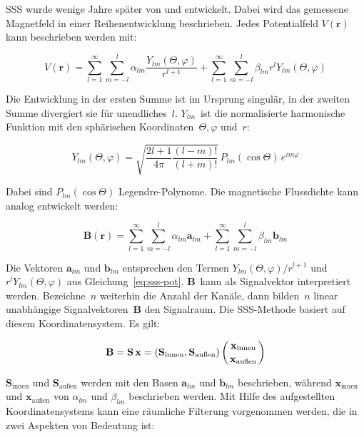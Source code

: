 \documentclass[doc,a4paper,12pt]{apa6}
\newcommand{\mx}[1]{\mathbf{#1}}
\begin{document}
SSS wurde wenige Jahre später von \textcite{taulu2004suppression} und \textcite{taulu2005presentation} entwickelt. Dabei wird das gemessene Magnetfeld in einer Reihenentwicklung beschrieben. Jedes Potentialfeld $V(\mx{r})$ kann beschrieben werden mit:

\begin{equation}
V(\mx{r}) = \sum_{l=1}^\infty \sum_{m=-l}^l \alpha_{lm} \frac{Y_{lm}(\Theta, \varphi)}{r^{l+1}} + \sum_{l=1}^\infty \sum_{m=-l}^l \beta_{lm} r^l Y_{lm}(\Theta, \varphi) 
\label{eq:sss-pot}
\end{equation}

Die Entwicklung in der ersten Summe ist im Ursprung singulär, in der zweiten Summe divergiert sie für unendliches~$l$. $Y_{lm}$~ist die normalisierte harmonische Funktion mit den sphärischen Koordinaten~$\Theta, \varphi$ und~$r$:

\begin{equation}
Y_{lm}(\Theta, \varphi) = \sqrt{\frac{2l+1}{4\pi} \frac{(l-m)!}{(l+m)!}}\, P_{lm}(\cos{\Theta})\,e^{im\varphi}
\end{equation}

Dabei sind $P_{lm}(\cos{\Theta})$ Legendre-Polynome. Die magnetische Flussdichte kann analog entwickelt werden:

\begin{equation}
\mx{B}(\mx{r}) = \sum_{l=1}^\infty \sum_{m=-l}^l \alpha_{lm} \mx{a}_{lm} + \sum_{l=1}^\infty \sum_{m=-l}^l \beta_{lm} \mx{b}_{lm}
\label{eq:sss-magpot}
\end{equation}

Die Vektoren $\mx{a}_{lm}$ und $\mx{b}_{lm}$ entsprechen den Termen $Y_{lm}(\Theta, \varphi)/r^{l+1}$ und $r^l Y_{lm}(\Theta, \varphi)$ aus Gleichung~\ref{eq:sss-pot}. $\mx{B}$~kann als Signalvektor interpretiert werden. Bezeichne~$n$ weiterhin die Anzahl der Kanäle, dann bilden~$n$ linear unabhängige Signalvektoren~$\mx{B}$ den Signalraum. Die SSS-Methode basiert auf diesem Koordinatensystem. Es gilt:

\begin{equation}
\mx{B} = \mx{S}\,\mx{x} = \left( \mx{S}_{\text{innen}}, \mx{S}_{\text{außen}} \right) \left( \mx{x}_{\text{innen}} \atop \mx{x}_{\text{außen}} \right)
\end{equation}

$\mx{S}_{\text{innen}}$ und $\mx{S}_{\text{außen}}$ werden mit den Basen $\mx{a}_{lm}$ und $\mx{b}_{lm}$ beschrieben, während $\mx{x}_{\text{innen}}$ und $\mx{x}_{\text{außen}}$ von $\alpha_{lm}$ und $\beta_{lm}$ beschrieben werden. Mit Hilfe des aufgestellten Koordinatensystems kann eine räumliche Filterung vorgenommen werden, die in zwei Aspekten von Bedeutung ist:
\end{document}
